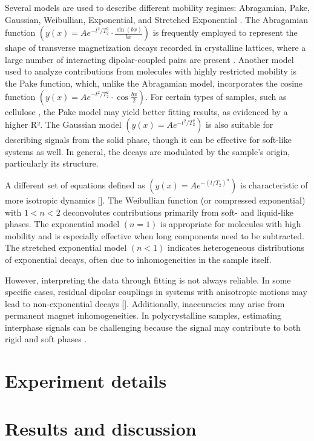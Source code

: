 \documentclass[a4paper,12pt]{article}
\begin{document}
Several models are used to describe different mobility regimes: Abragamian, Pake, Gaussian, Weibullian, Exponential, and Stretched Exponential \cite{Rntzsch2018}. 
The Abragamian function \((y(x) = A e^{-t^2/T_2^2} \cdot \frac{\sin(bx)}{bx})\) is frequently employed to represent the shape of transverse magnetization decays recorded in crystalline lattices, where a large number of interacting dipolar-coupled pairs are present \cite{Besghini2019}. 
Another model used to analyze contributions from molecules with highly restricted mobility is the Pake function, which, unlike the Abragamian model, incorporates the cosine function \((y(x) = A e^{-t^2/T_2^2} \cdot \cos \frac{bx}{2})\).
For certain types of samples, such as cellulose \cite{Grunin2017, Grunin2019}, the Pake model may yield better fitting results, as evidenced by a higher R². 
The Gaussian model \((y(x) = A e^{-t^2/T_2^2})\) is also suitable for describing signals from the solid phase, though it can be effective for soft-like systems as well. 
In general, the decays are modulated by the sample’s origin, particularly its structure.

A different set of equations defined as \((y(x) = A e^{-(t/T_2)^n})\) is characteristic of more isotropic dynamics []. 
The Weibullian function (or compressed exponential) \cite{Rntzsch2018} with \(1 < n < 2\) deconvolutes contributions primarily from soft- and liquid-like phases. The exponential model \((n = 1)\) is appropriate for molecules with high mobility and is especially effective when long components need to be subtracted. 
The stretched exponential model \((n < 1)\) indicates heterogeneous distributions of exponential decays, often due to inhomogeneities in the sample itself.

However, interpreting the data through fitting is not always reliable. 
In some specific cases, residual dipolar couplings in systems with anisotropic motions may lead to non-exponential decays []. 
Additionally, inaccuracies may arise from permanent magnet inhomogeneities. 
In polycrystalline samples, estimating interphase signals can be challenging because the signal may contribute to both rigid and soft phases \cite{Gorbunova2022}.

\newpage
\section{Experiment details}

\newpage
\section{Results and discussion}\label{sec:Results and discussion}
\end{document}
